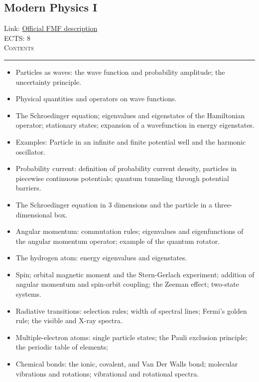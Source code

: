 \documentclass[11pt, a4paper]{article}
\newenvironment{course}[3]{
\subsection{#1}%
Link: \href{#2}{Official FMF description}\\%
ECTS: #3%
\vspace{1ex}
\\
{\large \textsc{Contents}}\\[-0.9ex]%
\rule{\textwidth}{0.5pt}
\vspace{-3ex}
}
{}
\newenvironment{chapter}[1]{
\begin{tcolorbox}[title=#1, breakable]
}
{\end{tcolorbox}}
\begin{document}
\begin{course}{Modern Physics I}{https://www.fmf.uni-lj.si/en/study-physics/programmes/1fiz/2020/7000777/courses/1161/}{8}
\begin{chapter}{Quantum physics}
\begin{itemize}
            \item Particles as waves: the wave function and probability amplitude; the uncertainty principle.

            \item Physical quantities and operators on wave functions.

            \item The Schroedinger equation; eigenvalues and eigenstates of the Hamiltonian operator; stationary states;  expansion of a wavefunction in energy eigenstates.

            \item Examples: Particle in an infinite and finite potential well and the harmonic oscillator.

            \item Probability current: definition of probability current density, particles in piecewise continuous potentials; quantum tunneling through potential barriers.

            \item The Schroedinger equation in 3 dimensions and the particle in a three-dimensional box. 

            \item Angular momentum: commutation rules; eigenvalues and eigenfunctions of the angular momentum operator; example of the quantum rotator.

            \item The hydrogen atom: energy eigenvalues and eigenstates.

            \item Spin; orbital magnetic moment and the Stern-Gerlach experiment; addition of angular momentum and spin-orbit coupling; the Zeeman effect; two-state systems.

            \item Radiative transitions: selection rules; width of spectral lines; Fermi's golden rule; the visible and X-ray spectra.

            \item Multiple-electron atoms: single particle states; the Pauli exclusion principle; the periodic table of elements; 

            \item Chemical bonds: the ionic, covalent, and Van Der Walls bond; molecular vibrations and rotations; vibrational and rotational spectra.

        \end{itemize}
    \end{chapter}

\end{course}
\end{document}
